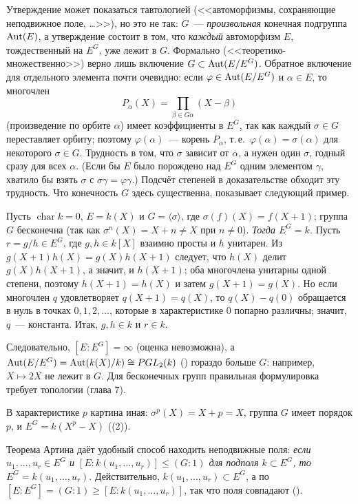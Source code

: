 \begin{remark}
Утверждение  может показаться тавтологией (<<автоморфизмы, сохраняющие неподвижное поле, \dots>>), но это не
так: $G$~--- \emph{произвольная} конечная подгруппа $\operatorname{Aut}(E)$, а утверждение состоит в том, что \emph{каждый}
автоморфизм $E$, тождественный на $E^G$, уже лежит в $G$. Формально (<<теоретико-множественно>>) верно лишь включение
$G\subset\operatorname{Aut}(E/E^G)$. Обратное включение для отдельного элемента почти очевидно: если $\varphi\in\operatorname{Aut}(E/E^G)$ и
$\alpha\in E$, то многочлен
\[
P_\alpha(X)=\prod_{\beta\in G\alpha}(X-\beta)
\]
(произведение по орбите $\alpha$) имеет коэффициенты в $E^G$, так как каждый $\sigma\in G$ переставляет орбиту; поэтому
$\varphi(\alpha)$~--- корень $P_\alpha$, т.\,е.\ $\varphi(\alpha)=\sigma(\alpha)$ для некоторого $\sigma\in G$. Трудность в том,
что $\sigma$ зависит от $\alpha$, а нужен один $\sigma$, годный сразу для всех $\alpha$. (Если бы $E$ было порождено над
$E^G$ одним элементом $\gamma$, хватило бы взять $\sigma$ с $\sigma\gamma=\varphi\gamma$.) Подсчёт степеней в доказательстве
 обходит эту трудность. Что конечность $G$ здесь существенна, показывает следующий пример.
\end{remark}

\begin{example}[3.5b]
Пусть $\operatorname{char}k=0$, $E=k(X)$ и $G=\langle\sigma\rangle$, где $\sigma(f)(X)=f(X+1)$; группа $G$ бесконечна (так
как $\sigma^n(X)=X+n\ne X$ при $n\ne0$). \emph{Тогда $E^G=k$.} Пусть $r=g/h\in E^G$, где $g,h\in k[X]$ взаимно просты и $h$
унитарен. Из $g(X+1)h(X)=g(X)h(X+1)$ следует, что $h(X)$ делит $g(X)h(X+1)$, а значит, и $h(X+1)$; оба многочлена унитарны
одной степени, поэтому $h(X+1)=h(X)$ и затем $g(X+1)=g(X)$. Но если многочлен $q$ удовлетворяет $q(X+1)=q(X)$, то
$q(X)-q(0)$ обращается в нуль в точках $0,1,2,\dots$, которые в характеристике $0$ попарно различны; значит, $q$~---
константа. Итак, $g,h\in k$ и $r\in k$.

Следовательно, $[E:E^G]=\infty$ (оценка  невозможна), а $\operatorname{Aut}(E/E^G)=\operatorname{Aut}(k(X)/k)\cong PGL_2(k)$ ()
гораздо больше $G$: например, $X\mapsto 2X$ не лежит в $G$. Для бесконечных групп правильная формулировка требует
топологии (глава 7).

В характеристике $p$ картина иная: $\sigma^p(X)=X+p=X$, группа $G$ имеет порядок $p$, и $E^G=k(X^p-X)$ ((2)).
\end{example}

Теорема Артина даёт удобный способ находить неподвижные поля: \emph{если $u_1,\dots,u_r\in E^G$ и
$[E:k(u_1,\dots,u_r)]\le(G:1)$ для подполя $k\subset E^G$, то $E^G=k(u_1,\dots,u_r)$}. Действительно,
$k(u_1,\dots,u_r)\subset E^G$, а по  $[E:E^G]=(G:1)\ge[E:k(u_1,\dots,u_r)]$, так что поля совпадают ().

